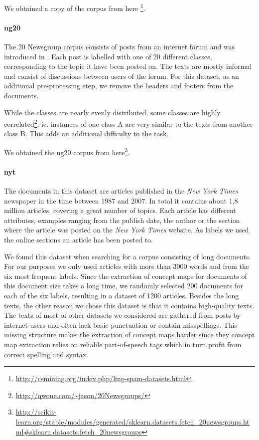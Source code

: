 We obtained a copy of the corpus from here \footnote{\url{http://csmining.org/index.php/ling-spam-datasets.html}}.


\paragraph{ng20}
The 20 Newsgroup corpus consists of posts from an internet forum and was introduced in \cite{Lang}. Each post is labelled with one of 20 different classes, corresponding to the topic it have been posted on. The texts are mostly informal and consist of discussions between users of the forum.
For this dataset, as an additional pre-processing step, we remove the headers and footers from the documents.

While the classes are nearly evenly distributed, some classes are highly correlated\footnote{\url{http://qwone.com/~jason/20Newsgroups/}}, ie. instances of one class A are very similar to the texts from another class B. This adds an additional difficulty to the task.

We obtained the ng20 corpus from here\footnote{\url{http://scikit-learn.org/stable/modules/generated/sklearn.datasets.fetch\_20newsgroups.html\#sklearn.datasets.fetch_20newsgroups}}.

\paragraph{nyt}
The documents in this dataset are articles published in the \textit{New York Times} newspaper in the time between 1987 and 2007.
In total it contains about 1,8 million articles, covering a great number of topics.
Each article has different attributes, examples ranging from the publish date, the author or the section where the article was posted on the \textit{New York Times} website.
As labels we used the online sections an article has been posted to.

We found this dataset when searching for a corpus consisting of long documents. 
For our purposes we only used articles with more than 3000 words and from the six most frequent labels.
Since the extraction of concept maps for documents of this document size takes a long time, we randomly selected 200 documents for each of the six labels, resulting in a dataset of 1200 articles.
Besides the long texts, the other reason we chose this dataset is that it contains high-quality texts.
The texts of most of other datasets we considered are gathered from posts by internet users and often lack basic punctuation or contain misspellings.
This missing structure makes the extraction of concept maps harder since they concept map extraction relies on reliable part-of-speech tags which in turn profit from correct spelling and syntax. 

